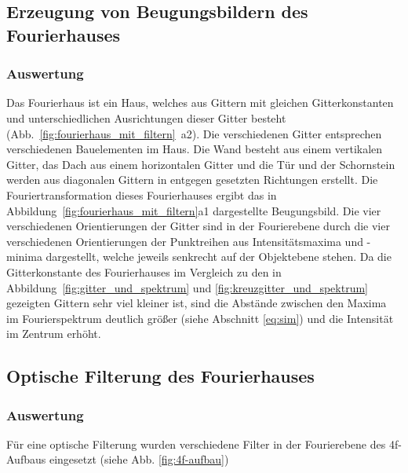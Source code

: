 \subsection{Erzeugung von Beugungsbildern des Fourierhauses}
\subsubsection*{Auswertung}

Das Fourierhaus ist ein Haus, welches aus Gittern mit gleichen Gitterkonstanten und unterschiedlichen Ausrichtungen dieser Gitter besteht (Abb.~\ref{fig:fourierhaus_mit_filtern}~a2). Die verschiedenen Gitter entsprechen verschiedenen Bauelementen im Haus. Die Wand besteht aus einem vertikalen Gitter, das Dach aus einem horizontalen Gitter und die Tür und der Schornstein werden aus diagonalen Gittern in entgegen gesetzten Richtungen erstellt. Die Fouriertransformation dieses Fourierhauses ergibt das in Abbildung~\ref{fig:fourierhaus_mit_filtern}a1 dargestellte Beugungsbild. Die vier verschiedenen Orientierungen der Gitter sind in der Fourierebene durch die vier verschiedenen Orientierungen der Punktreihen aus Intensitätsmaxima und -minima dargestellt, welche jeweils senkrecht auf der Objektebene stehen. Da die Gitterkonstante des Fourierhauses im Vergleich zu den in Abbildung~\ref{fig:gitter_und_spektrum} und \ref{fig:kreuzgitter_und_spektrum} gezeigten Gittern sehr viel kleiner ist, sind die Abstände zwischen den Maxima im Fourierspektrum deutlich größer (siehe Abschnitt \ref{eq:sim}) und die Intensität im Zentrum erhöht.


\subsection{Optische Filterung des Fourierhauses}
\subsubsection*{Auswertung}

Für eine optische Filterung wurden verschiedene Filter in der Fourierebene des 4f-Aufbaus eingesetzt (siehe Abb. \ref{fig:4f-aufbau})


